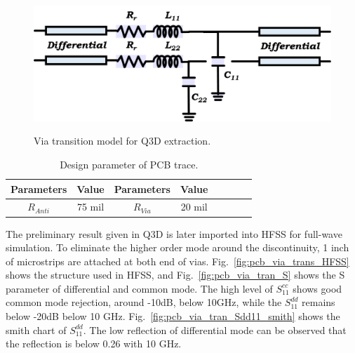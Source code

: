\documentclass{book}  %
\begin{document}
\begin{paper}
\begin{figure}[htbp!]
\begin{minipage}[b]{0.5\linewidth}
		\label{fig:pcb_via_lump}
	\end{minipage}
	\begin{minipage}[b]{\linewidth}
		\includegraphics[width=\textwidth]{./img/PCB/Via_Transition/lumped_model.png}
		\label{fig:pcb_via_lump_model}
	\end{minipage}
	\caption{Via transition model for Q3D extraction.}	
	\vskip0.2in	
\end{figure}

\begin{table}[htbp!]
	\renewcommand{\arraystretch}{1.3}	
	\begin{center}
		\begin{tabular}{| c | c | c | c | c | c | c | c |}
			\hline
			Parameters  & Value  & Parameters & Value  \\ \hline
			$R_{Anti}$  & 75 mil & $R_{Via}$  & 20 mil \\
			\hline
		\end{tabular}
	\end{center}
	\label{table:pcb_via_tran}
	\caption{Design parameter of PCB trace.}
\end{table}
%
The preliminary result given in Q3D is later imported into HFSS for full-wave simulation. To eliminate the higher order mode around the discontinuity,  1 inch of microstrips are attached at both end of vias. Fig.~\ref{fig:pcb_via_trans_HFSS} shows the structure used in HFSS, and Fig.~\ref{fig:pcb_via_tran_S} shows the S parameter of differential and common mode. The high level of $S^{cc}_{11}$ shows good common mode rejection, around -10dB, below 10GHz, while the $S^{dd}_{11}$ remains below -20dB below 10 GHz. Fig.~\ref{fig:pcb_via_tran_Sdd11_smith} shows the smith chart of $S^{dd}_{11}$. The low reflection of differential mode can be observed that the reflection is below 0.26 with 10 GHz.


\end{paper}
\end{document}
